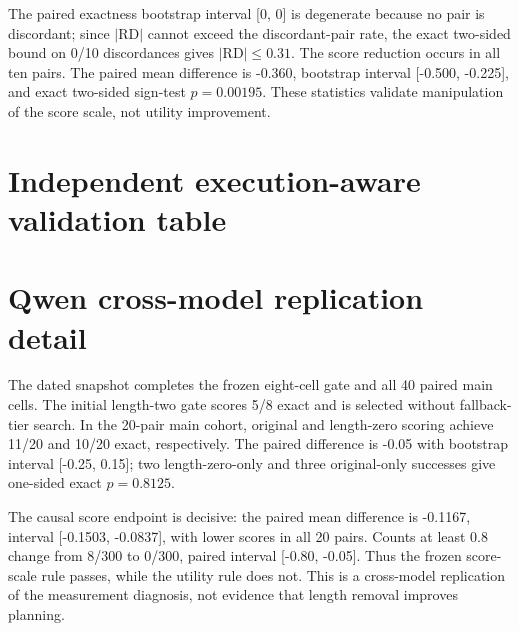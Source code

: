 The paired exactness bootstrap interval [0, 0] is degenerate because no pair is discordant; since $|\mathrm{RD}|$ cannot exceed the discordant-pair rate, the exact two-sided bound on 0/10 discordances gives $|\mathrm{RD}|\le0.31$. The score reduction occurs in all ten pairs. The paired mean difference is -0.360, bootstrap interval [-0.500, -0.225], and exact two-sided sign-test \(p=0.00195\). These statistics validate manipulation of the score scale, not utility improvement.

\section{Independent execution-aware validation table}

\begin{center}
\end{center}

\section{Qwen cross-model replication detail}
\label{app:qwendetail}

The dated \texttt{} snapshot completes the frozen eight-cell gate and all 40 paired main cells. The initial length-two gate scores 5/8 exact and is selected without fallback-tier search. In the 20-pair main cohort, original and length-zero scoring achieve 11/20 and 10/20 exact, respectively. The paired difference is -0.05 with bootstrap interval [-0.25, 0.15]; two length-zero-only and three original-only successes give one-sided exact \(p=0.8125\).

The causal score endpoint is decisive: the paired mean difference is -0.1167, interval [-0.1503, -0.0837], with lower scores in all 20 pairs. Counts at least 0.8 change from 8/300 to 0/300, paired interval [-0.80, -0.05]. Thus the frozen score-scale rule passes, while the utility rule does not. This is a cross-model replication of the measurement diagnosis, not evidence that length removal improves planning.

